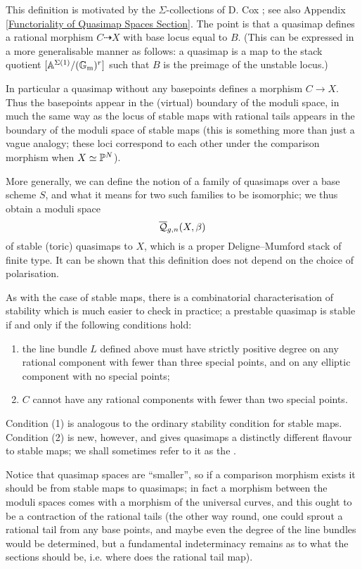 \begin{remark} This definition is motivated by the $\Sigma$-collections of D. Cox \cite{CoxFunctor}; see also Appendix \ref{Functoriality of Quasimap Spaces Section}. The point is that a quasimap defines a rational morphism $C \dashrightarrow X$ with base locus equal to $B$. (This can be expressed in a more generalisable manner as follows: a quasimap is a map to the stack quotient $[\mathbb{A}^{\Sigma(1)} / (\mathbb{G}_{\text{m}})^r]$ such that $B$ is the preimage of the unstable locus.)

In particular a quasimap without any basepoints defines a morphism $C \to X$. Thus the basepoints appear in the (virtual) boundary of the moduli space, in much the same way as the locus of stable maps with rational tails appears in the boundary of the moduli space of stable maps (this is something more than just a vague analogy; these loci correspond to each other under the comparison morphism when $X\simeq\mathbb P^N$). \end{remark}

More generally, we can define the notion of a family of quasimaps over a base scheme $S$, and what it means for two such families to be isomorphic; we thus obtain a moduli space
\begin{equation*} \overline{\mathcal Q}_{g,n}(X,\beta) \end{equation*}
of stable (toric) quasimaps to $X$, which is a proper Deligne--Mumford stack of finite type. It can be shown that this definition does not depend on the choice of polarisation.

As with the case of stable maps, there is a combinatorial characterisation of stability which is much easier to check in practice; a prestable quasimap is stable if and only if the following conditions hold:
\begin{enumerate}
\item the line bundle $L$ defined above must have strictly positive degree on any rational component with fewer than three special points, and on any elliptic component with no special points;
\item $C$ cannot have any rational components with fewer than two special points.
\end{enumerate}
Condition (1) is analogous to the ordinary stability condition for stable maps. Condition (2) is new, however, and gives quasimaps a distinctly different flavour to stable maps; we shall sometimes refer to it as the . 

\begin{remark}
 Notice that quasimap spaces are ``smaller'', so if a comparison morphism exists it should be from stable maps to quasimaps; in fact a morphism between the moduli spaces comes with a morphism of the universal curves, and this ought to be a contraction of the rational tails (the other way round, one could sprout a rational tail from any base points, and maybe even the degree of the line bundles would be determined, but a fundamental indeterminacy remains as to what the sections should be, i.e. where does the rational tail map).
\end{remark}

